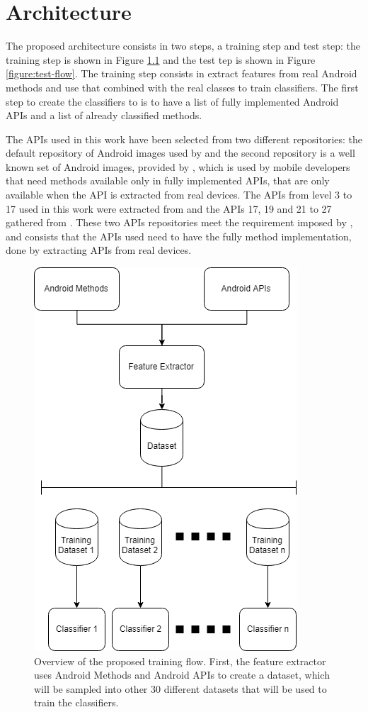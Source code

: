 \chapter{Architecture}

The proposed architecture consists in two steps, a training step and test step: the training step is shown in Figure \ref{figure:train-flow} and the test tep is shown in Figure \ref{figure:test-flow}. The training step consists in extract features from real Android methods and use that combined with the real classes to train classifiers. The first step to create the classifiers to is to have a list of fully implemented Android APIs and a list of already classified methods.

The APIs used in this work have been selected from two different repositories: the default repository of Android images used by \cite{rasthofer2014machine} and the second repository is a well known set of Android images, provided by \cite{hiddenapi}, which is used by mobile developers that need methods available only in fully implemented APIs, that are only available when the API is extracted from real devices. The APIs from level 3 to 17 used in this work were extracted from \cite{rasthofer2014api} and the APIs 17, 19 and 21 to 27 gathered from \cite{hiddenapi}. These two APIs repositories meet the requirement imposed by \cite{rasthofer2014machine}, and consists that the APIs used need to have the fully method implementation, done by extracting APIs from real devices.

\begin{figure}[!h]
    \begin{center}
        \includegraphics[width=0.5\linewidth]{images/architectures-training.png}
    \end{center}
    \caption{%
        Overview of the proposed training flow. First, the feature extractor uses Android Methods and %
        Android APIs to create a dataset, which will be sampled into other 30 different datasets that will be used %
        to train the classifiers.%
    }\label{figure:train-flow}
    \vspace{4ex}
\end{figure}

